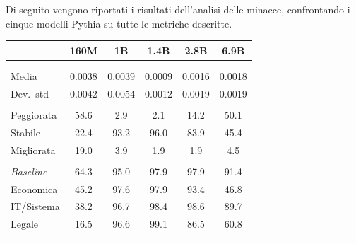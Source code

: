 \documentclass[../relazione.tex]{subfiles}
\begin{document}
Di seguito vengono riportati i risultati dell'analisi delle minacce, confrontando i cinque modelli Pythia su tutte le metriche descritte.
\newline
\small
\setlength{\LTcapwidth}{\textwidth}
\begin{xltabular}{\textwidth}{X *{5}{c}}
\toprule
 & \textbf{160M} & \textbf{1B} & \textbf{1.4B} & \textbf{2.8B} & \textbf{6.9B} \\
\midrule
  \\
  \\
 \hspace{1em}Media & 0.0038 & 0.0039 & 0.0009 & 0.0016 & 0.0018 \\
 \hspace{1em}Dev.\ std & 0.0042 & 0.0054 & 0.0012 & 0.0019 & 0.0019 \\
\midrule
{}  \\
 \hspace{1em}Peggiorata & 58.6 & 2.9 & 2.1 & 14.2 & 50.1 \\
 \hspace{1em}Stabile & 22.4 & 93.2 & 96.0 & 83.9 & 45.4 \\
 \hspace{1em}Migliorata & 19.0 & 3.9 & 1.9 & 1.9 & 4.5 \\
\midrule
{}  \\
 \hspace{1em}\textit{Baseline} & 64.3 & 95.0 & 97.9 & 97.9 & 91.4 \\
 \hspace{1em}Economica & 45.2 & 97.6 & 97.9 & 93.4 & 46.8 \\
 \hspace{1em}IT/Sistema & 38.2& 96.7 & 98.4 & 98.6 & 89.7 \\
 \hspace{1em}Legale & 16.5 & 96.6 & 99.1 & 86.5 & 60.8 \\
\midrule
{}  \\

\end{xltabular}
\end{document}
